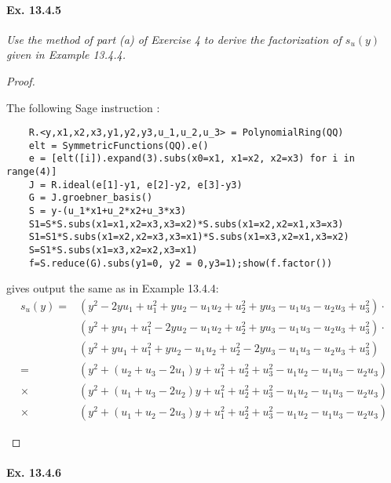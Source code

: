 \documentclass[11pt,a4paper]{article}
\newcommand{\be} {\begin{enumerate}}
\newcommand{\ee} {\end{enumerate}}
\begin{document}
\paragraph{Ex. 13.4.5}

{\it Use the method of part (a) of Exercise 4 to derive the factorization of $s_u(y)$ given in Example 13.4.4.
\begin{proof}
\be
The following Sage instruction :
\begin{verbatim}
    R.<y,x1,x2,x3,y1,y2,y3,u_1,u_2,u_3> = PolynomialRing(QQ)
    elt = SymmetricFunctions(QQ).e()
    e = [elt([i]).expand(3).subs(x0=x1, x1=x2, x2=x3) for i in range(4)]
    J = R.ideal(e[1]-y1, e[2]-y2, e[3]-y3)
    G = J.groebner_basis()
    S = y-(u_1*x1+u_2*x2+u_3*x3)
    S1=S*S.subs(x1=x1,x2=x3,x3=x2)*S.subs(x1=x2,x2=x1,x3=x3)
    S1=S1*S.subs(x1=x2,x2=x3,x3=x1)*S.subs(x1=x3,x2=x1,x3=x2)
    S=S1*S.subs(x1=x3,x2=x2,x3=x1)
    f=S.reduce(G).subs(y1=0, y2 = 0,y3=1);show(f.factor())
\end{verbatim}
gives output the same as in Example 13.4.4:
\begin{align*}
s_u(y)=&(y^{2} - 2 y u_{1} + u_{1}^{2} + y u_{2} - u_{1} u_{2} + u_{2}^{2} + y u_{3} - u_{1} u_{3} - u_{2} u_{3} + u_{3}^{2}) \cdot \\&(y^{2} + y u_{1} + u_{1}^{2} - 2 y u_{2} - u_{1} u_{2} + u_{2}^{2} + y u_{3} - u_{1} u_{3} - u_{2} u_{3} + u_{3}^{2}) \cdot \\&(y^{2} + y u_{1} + u_{1}^{2} + y u_{2} - u_{1} u_{2} + u_{2}^{2} - 2 y u_{3} - u_{1} u_{3} - u_{2} u_{3} + u_{3}^{2})\\
=&(y^{2} + (u_{2}+ u_{3}-2u_{1})y + u_{1}^{2} + u_{2}^{2} + u_{3}^{2}   - u_{1} u_{2} - u_{1} u_{3} - u_{2} u_{3}) \\
\times&(y^{2} + (u_{1}+ u_{3}-2u_{2})y + u_{1}^{2} + u_{2}^{2} + u_{3}^{2}   - u_{1} u_{2} - u_{1} u_{3} - u_{2} u_{3})  \\
\times&(y^{2} + (u_{1}+ u_{2}-2u_{3})y + u_{1}^{2} + u_{2}^{2} + u_{3}^{2}   - u_{1} u_{2} - u_{1} u_{3} - u_{2} u_{3})
\end{align*}

\ee\end{proof}
}

\paragraph{Ex. 13.4.6}
\end{document}
